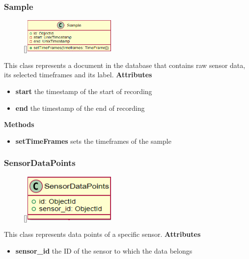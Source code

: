 \subsubsection{Sample}
\begin{figure}
    \raisebox{0pt}[\dimexpr{}\baselineskip\relax]{\includegraphics[width=4.5cm]{classes/workspace-management/7.png}}
\end{figure} 
\par
This class represents a document in the database that contains raw sensor data, its selected timeframes and its label.
\newline
\newline
\textbf{Attributes}
\begin{itemize}
    \item \textbf{start} the timestamp of the start of recording
    \item \textbf{end} the timestamp of the end of recording
\end{itemize}
\textbf{Methods}
\begin{itemize}
    \item \textbf{setTimeFrames} sets the timeframes of the sample
\end{itemize}

\subsubsection{SensorDataPoints}
\begin{figure}
    \raisebox{0pt}[\dimexpr{}\baselineskip\relax]{\includegraphics[width=4.5cm]{classes/workspace-management/8.png}}
\end{figure} 
\par
This class represents data points of a specific sensor.
\newline
\newline
\textbf{Attributes}
\begin{itemize}
    \item \textbf{sensor\_id} the ID of the sensor to which the data belongs
\end{itemize}


